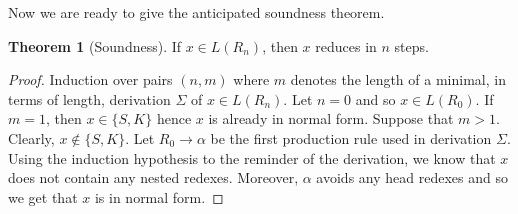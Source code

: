 \documentclass[11pt,a4paper]{amsart}
\theoremstyle{definition}
\newtheorem{theorem}{Theorem}
\begin{document}
Now we are ready to give the anticipated soundness theorem.

\begin{theorem}[Soundness]\label{the-correctness}
        If $x \in L(R_n)$, then $x$ reduces in $n$ steps.
\end{theorem}
\begin{proof}
        Induction over pairs $(n,m)$ where $m$ denotes the length of a
        minimal, in terms of length, derivation $\Sigma$ of $x \in L(R_n)$.  Let
        $n = 0$ and so $x \in L(R_0)$. If $m = 1$, then $x \in \{S,K\}$ hence
        $x$ is already in normal form. Suppose that $m > 1$. Clearly, $x \not \in
        \{S,K\}$. Let $R_0 \to \alpha$ be the first production rule used in
        derivation $\Sigma$. Using the induction hypothesis to the reminder of
        the derivation, we know that $x$ does not contain any nested redexes.
        Moreover, $\alpha$ avoids any head redexes and so we get that $x$ is in
        normal form.  
        

\end{proof}
\end{document}
